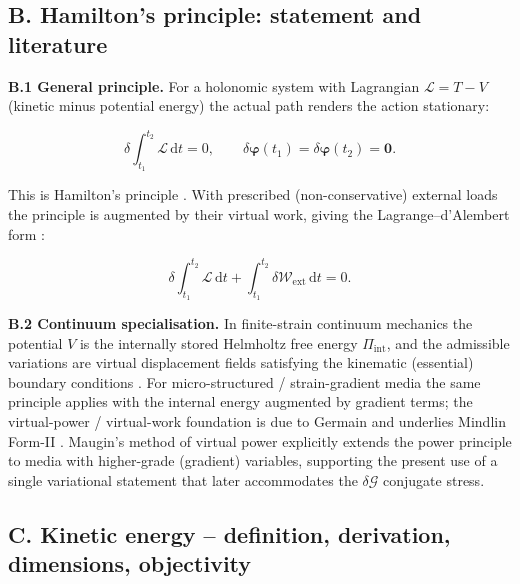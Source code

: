 \documentclass[11pt]{article}
\begin{document}
\subsection{B. Hamilton's principle: statement and literature}

\textbf{B.1 General principle.} For a holonomic system with Lagrangian $\mathcal{L}=T-V$ (kinetic minus potential energy) the actual path renders the action stationary:

\begin{equation}
\delta\int_{t_{1}}^{t_{2}}\mathcal{L}\,\mathrm{d}t = 0,
\qquad
\delta\boldsymbol{\varphi}(t_{1})=\delta\boldsymbol{\varphi}(t_{2})=\mathbf{0}.
\label{rn:Ham_conservative}
\end{equation}

This is Hamilton's principle \cite{Hamilton1834,Goldstein2002}. With prescribed (non-conservative) external loads the principle is augmented by their virtual work, giving the Lagrange--d'Alembert form \cite{Goldstein2002,Gurtin1981}:

\begin{equation}
\delta\int_{t_{1}}^{t_{2}}\mathcal{L}\,\mathrm{d}t
+ \int_{t_{1}}^{t_{2}}\delta\mathcal{W}_{\mathrm{ext}}\,\mathrm{d}t = 0.
\label{rn:Ham_noncons}
\end{equation}

\textbf{B.2 Continuum specialisation.} In finite-strain continuum mechanics the potential $V$ is the internally stored Helmholtz free energy $\Pi_{\mathrm{int}}$, and the admissible variations are virtual displacement fields satisfying the kinematic (essential) boundary conditions \cite{MarsdenHughes1983,Gurtin1981}. For micro-structured / strain-gradient media the same principle applies with the internal energy augmented by gradient terms; the virtual-power / virtual-work foundation is due to Germain \cite{Germain1973} and underlies Mindlin Form-II \cite{MindlinEshel1968,Toupin1962}. Maugin's method of virtual power \cite{Maugin1980} explicitly extends the power principle to media with higher-grade (gradient) variables, supporting the present use of a single variational statement that later accommodates the $\delta\bm{\mathcal{G}}$ conjugate stress.

\subsection{C. Kinetic energy -- definition, derivation, dimensions, objectivity}
\end{document}
